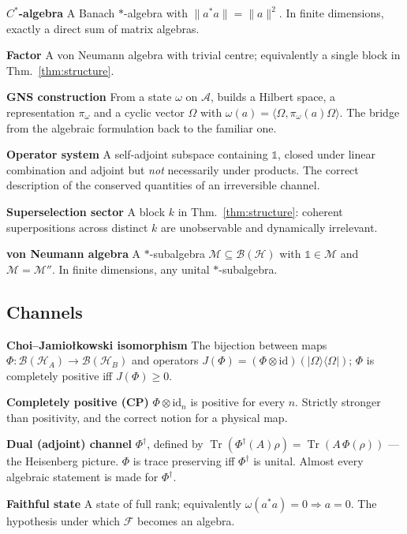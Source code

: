 \documentclass[11pt]{article}
\newcommand{\Tr}{\operatorname{Tr}}
\newcommand{\Phid}{\Phi^{\dagger}}
\newcommand{\B}{\mathcal{B}}
\newcommand{\A}{\mathcal{A}}
\newcommand{\F}{\mathcal{F}}
\newcommand{\HH}{\mathcal{H}}
\newcommand{\M}{\mathcal{M}}
\newcommand{\term}[1]{\medskip\noindent\textbf{#1}\quad}
\theoremstyle{plain}
\theoremstyle{remark}
\begin{document}
\term{$C^*$-algebra} A Banach $*$-algebra with
$\lVert a^*a\rVert = \lVert a\rVert^2$. In finite dimensions, exactly a direct
sum of matrix algebras. \cite{Murphy1990, Landsman2017}

\term{Factor} A von Neumann algebra with trivial centre; equivalently a single
block in Thm.~\ref{thm:structure}. \cite{BR1}

\term{GNS construction} From a state $\omega$ on $\A$, builds a Hilbert space,
a representation $\pi_\omega$ and a cyclic vector $\Omega$ with
$\omega(a) = \langle\Omega, \pi_\omega(a)\Omega\rangle$. The bridge from the
algebraic formulation back to the familiar one. \cite{BR1, Strocchi2008}

\term{Operator system} A self-adjoint subspace containing $\mathbb{1}$, closed
under linear combination and adjoint but \emph{not} necessarily under products.
The correct description of the conserved quantities of an irreversible channel.
\cite{Wolf2012}

\term{Superselection sector} A block $k$ in Thm.~\ref{thm:structure}: coherent
superpositions across distinct $k$ are unobservable and dynamically irrelevant.
\cite{Haag1996, BR1}

\term{von Neumann algebra} A $*$-subalgebra $\M \subseteq \B(\HH)$ with
$\mathbb{1} \in \M$ and $\M = \M''$. In finite dimensions, any unital
$*$-subalgebra. \cite{BR1, Blackadar2006}

\subsection{Channels}

\term{Choi--Jamio\l{}kowski isomorphism} The bijection between maps
$\Phi : \B(\HH_A) \to \B(\HH_B)$ and operators
$J(\Phi) = (\Phi\otimes\mathrm{id})(|\Omega\rangle\langle\Omega|)$; $\Phi$ is
completely positive iff $J(\Phi) \ge 0$. \cite{Wolf2012, Watrous2018}

\term{Completely positive (CP)} $\Phi \otimes \mathrm{id}_n$ is positive for
every $n$. Strictly stronger than positivity, and the correct notion for a
physical map. \cite{Wolf2012}

\term{Dual (adjoint) channel} $\Phid$, defined by
$\Tr(\Phid(A)\rho) = \Tr(A\,\Phi(\rho))$ --- the Heisenberg picture. $\Phi$ is
trace preserving iff $\Phid$ is unital. Almost every algebraic statement is
made for $\Phid$. \cite{Wolf2012}

\term{Faithful state} A state of full rank; equivalently
$\omega(a^*a) = 0 \Rightarrow a = 0$. The hypothesis under which $\F$ becomes an
algebra. \cite{Frigerio1978}
\end{document}
